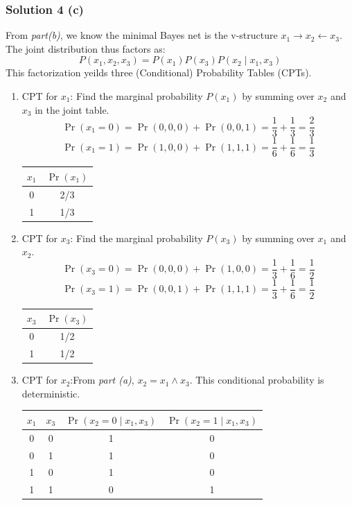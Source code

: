 \documentclass{article}
\begin{document}
\subsubsection*{Solution 4 (c)}
From \textit{part(b)}, we know the minimal Bayes net is the v-structure $x_1 \to x_2 \leftarrow x_3$. The joint distribution thus factors as:
$$ P(x_1, x_2, x_3) = P(x_1) P(x_3) P(x_2 \mid x_1, x_3) $$
This factorization yeilds three (Conditional) Probability Tables (CPTs).
\begin{enumerate}
    \item CPT for $x_1$: Find the marginal probability $P(x_1)$ by summing over $x_2$ and $x_3$ in the joint table.
    $$\Pr(x_1=0) = \Pr(0,0,0) + \Pr(0,0,1) = \frac{1}{3} + \frac{1}{3} = \frac{2}{3}$$
    $$\Pr(x_1=1) = \Pr(1,0,0) + \Pr(1,1,1) = \frac{1}{6} + \frac{1}{6} = \frac{1}{3}$$
    \begin{center}
    \begin{tabular}{c|c}
    $x_1$ & $\Pr(x_1)$ \\\hline
    0 & 2/3 \\
    1 & 1/3
    \end{tabular}
    \end{center}
    \item CPT for $x_3$: Find the marginal probability $P(x_3)$ by summing over $x_1$ and $x_2$.
    $$\Pr(x_3=0) = \Pr(0,0,0) + \Pr(1,0,0) = \frac{1}{3} + \frac{1}{6} = \frac{1}{2}$$
    $$\Pr(x_3=1) = \Pr(0,0,1) + \Pr(1,1,1) = \frac{1}{3} + \frac{1}{6} = \frac{1}{2}$$
    \begin{center}
    \begin{tabular}{c|c}
    $x_3$ & $\Pr(x_3)$ \\\hline
    0 & 1/2 \\
    1 & 1/2
    \end{tabular}
    \end{center}
    \item CPT for $x_2$:From \textit{part (a)}, $x_2 = x_1 \land x_3$. This conditional probability is deterministic.
    \begin{center}
    \begin{tabular}{cc|c|c}
    $x_1$ & $x_3$ & $\Pr(x_2=0 \mid x_1, x_3)$ & $\Pr(x_2=1 \mid x_1, x_3)$ \\\hline
    0 & 0 & 1 & 0 \\
    0 & 1 & 1 & 0 \\
    1 & 0 & 1 & 0 \\
    1 & 1 & 0 & 1
    \end{tabular}
    \end{center}

\end{enumerate}
\end{document}
